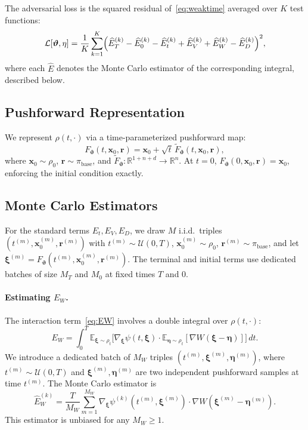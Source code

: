 \documentclass[12pt]{article}
\newcommand{\bx}{\mathbf{x}}
\newcommand{\br}{\mathbf{r}}
\newcommand{\bxi}{\boldsymbol{\xi}}
\newcommand{\bfeta}{\boldsymbol{\eta}}
\newcommand{\vth}{\boldsymbol{\vartheta}}
\newcommand{\E}{\mathbb{E}}
\newcommand{\R}{\mathbb{R}}
\newcommand{\Rn}{\mathbb{R}^n}
\newcommand{\hatE}{\widehat{E}}
\theoremstyle{plain}
\begin{document}
The adversarial loss is the squared residual of~\eqref{eq:weaktime} averaged over $K$
test functions:
\begin{equation}
  \mathcal{L}[\vth,\eta] = \frac{1}{K}\sum_{k=1}^K
  \Bigl(\hatE_T^{(k)} - \hatE_0^{(k)} - \hatE_t^{(k)}
    + \hatE_V^{(k)} + \hatE_W^{(k)} - \hatE_D^{(k)}\Bigr)^2,
  \label{eq:loss_time}
\end{equation}
where each $\hatE$ denotes the Monte Carlo estimator of the corresponding integral,
described below.

\subsection{Pushforward Representation}

We represent $\rho(t,\cdot)$ via a time-parameterized pushforward map:
\begin{equation}
  F_{\vth}(t,\bx_0,\br) = \bx_0 + \sqrt{t}\,\tilde{F}_{\vth}(t,\bx_0,\br),
  \label{eq:pf_time}
\end{equation}
where $\bx_0\sim\rho_0$, $\br\sim\pi_\mathrm{base}$, and
$\tilde{F}_{\vth}:\R^{1+n+d}\to\Rn$. At $t=0$, $F_{\vth}(0,\bx_0,\br)=\bx_0$,
enforcing the initial condition exactly.

\subsection{Monte Carlo Estimators}

For the standard terms $E_t, E_V, E_D$, we draw $M$ i.i.d.\ triples
$(t^{(m)},\bx_0^{(m)},\br^{(m)})$ with $t^{(m)}\sim\mathcal{U}(0,T)$,
$\bx_0^{(m)}\sim\rho_0$, $\br^{(m)}\sim\pi_\mathrm{base}$, and let
$\bxi^{(m)}=F_{\vth}(t^{(m)},\bx_0^{(m)},\br^{(m)})$. The terminal and initial terms
use dedicated batches of size $M_T$ and $M_0$ at fixed times $T$ and $0$.

\paragraph{Estimating $E_W$.}
The interaction term~\eqref{eq:EW} involves a double integral over $\rho(t,\cdot)$:
\begin{equation}
  E_W = \int_0^T \E_{\bxi\sim\rho_t}\!\bigl[\nabla_{\bxi}\psi(t,\bxi)\cdot
    \E_{\bfeta\sim\rho_t}[\nabla W(\bxi-\bfeta)]\bigr]\,dt.
  \label{eq:EW_rep}
\end{equation}
We introduce a dedicated batch of $M_W$ triples
$(t^{(m)},\bxi^{(m)},\bfeta^{(m)})$, where $t^{(m)}\sim\mathcal{U}(0,T)$ and
$\bxi^{(m)},\bfeta^{(m)}$ are two independent pushforward samples at time $t^{(m)}$.
The Monte Carlo estimator is
\begin{equation}
  \hatE_W^{(k)} = \frac{T}{M_W}\sum_{m=1}^{M_W}
    \nabla_{\bxi}\psi^{(k)}(t^{(m)},\bxi^{(m)})\cdot
    \nabla W(\bxi^{(m)}-\bfeta^{(m)}).
  \label{eq:EW_est}
\end{equation}
This estimator is unbiased for any $M_W\geq 1$.
\end{document}
